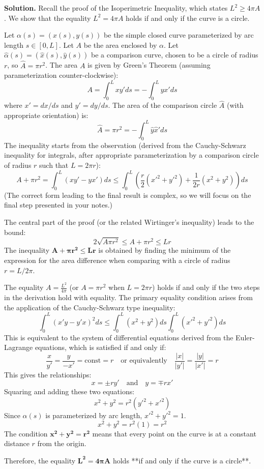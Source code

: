 \documentclass[12pt, a4paper, oneside]{article}
\newenvironment{solution}
  {\par\noindent\textbf{Solution. }\newline}
  {\par}
\begin{document}
\begin{solution}
Recall the proof of the Isoperimetric Inequality, which states $L^2 \geq 4\pi A$. We show that the equality $L^2 = 4\pi A$ holds if and only if the curve is a circle.

Let $\alpha(s) = (x(s), y(s))$ be the simple closed curve parameterized by arc length $s \in [0, L]$. Let $A$ be the area enclosed by $\alpha$.
Let $\hat{\alpha}(s) = (\hat{x}(s), \hat{y}(s))$ be a comparison curve, chosen to be a circle of radius $r$, so $\hat{A} = \pi r^2$.
The area $A$ is given by Green's Theorem (assuming parameterization counter-clockwise):
$$
A = \int_{0}^{L} x y' ds = -\int_{0}^{L} y x' ds
$$
where $x' = dx/ds$ and $y' = dy/ds$.
The area of the comparison circle $\hat{A}$ (with appropriate orientation) is:
$$
\hat{A} = \pi r^2 = -\int_{0}^{L} \hat{y} \hat{x}' ds
$$
The inequality starts from the observation (derived from the Cauchy-Schwarz inequality for integrals, after appropriate parameterization by a comparison circle of radius $r$ such that $L=2\pi r$):
$$
A + \pi r^2 = \int_{0}^{L} (x y' - y x') ds \leq \int_{0}^{L} \left( \frac{r}{2} (x'^2+y'^2) + \frac{1}{2r}(x^2+y^2) \right) ds
$$
(The correct form leading to the final result is complex, so we will focus on the final step presented in your notes.)

The central part of the proof (or the related Wirtinger's inequality) leads to the bound:
$$
2\sqrt{A \pi r^2} \leq A + \pi r^2 \leq L r
$$
The inequality $\mathbf{A + \pi r^2 \leq L r}$ is obtained by finding the minimum of the expression for the area difference when comparing with a circle of radius $r = L/2\pi$.

The equality $A = \frac{L^2}{4\pi}$ (or $A = \pi r^2$ when $L=2\pi r$) holds if and only if the two steps in the derivation hold with equality. The primary equality condition arises from the application of the Cauchy-Schwarz type inequality:
$$
\int_{0}^{L} (x'y - y'x)^2 ds \leq \int_{0}^{L} (x^2+y^2) ds \int_{0}^{L} (x'^2+y'^2) ds
$$
This is equivalent to the system of differential equations derived from the Euler-Lagrange equations, which is satisfied if and only if:
$$
\frac{x}{y'} = \frac{y}{-x'} = \text{const} = r \quad \text{or equivalently} \quad \frac{|x|}{|y'|} = \frac{|y|}{|x'|} = r
$$
This gives the relationships:
$$
x = \pm r y' \quad \text{and} \quad y = \mp r x'
$$
Squaring and adding these two equations:
$$
x^2 + y^2 = r^2 (y'^2 + x'^2)
$$
Since $\alpha(s)$ is parameterized by arc length, $x'^2 + y'^2 = 1$.
$$
x^2 + y^2 = r^2 (1) = r^2
$$
The condition $\mathbf{x^2 + y^2 = r^2}$ means that every point on the curve is at a constant distance $r$ from the origin.

Therefore, the equality $\mathbf{L^2 = 4\pi A}$ holds **if and only if the curve is a circle**.
\end{solution}
\end{document}
